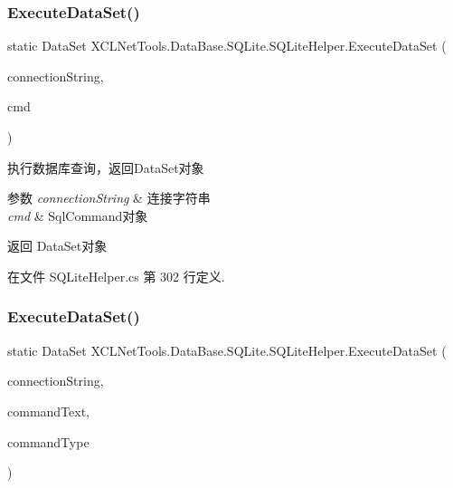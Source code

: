 \subsubsection{\texorpdfstring{Execute\+Data\+Set()}{ExecuteDataSet()}\hspace{0.1cm}{\footnotesize\ttfamily [1/3]}}
{\footnotesize\ttfamily static Data\+Set X\+C\+L\+Net\+Tools.\+Data\+Base.\+S\+Q\+Lite.\+S\+Q\+Lite\+Helper.\+Execute\+Data\+Set (\begin{DoxyParamCaption}\item[{string}]{connection\+String,  }\item[{S\+Q\+Lite\+Command}]{cmd }\end{DoxyParamCaption})\hspace{0.3cm}{\ttfamily [static]}}



执行数据库查询，返回\+Data\+Set对象 


\begin{DoxyParams}{参数}
{\em connection\+String} & 连接字符串\\
\hline
{\em cmd} & Sql\+Command对象\\
\hline
\end{DoxyParams}
\begin{DoxyReturn}{返回}
Data\+Set对象
\end{DoxyReturn}


在文件 S\+Q\+Lite\+Helper.\+cs 第 302 行定义.

\mbox{\label{class_x_c_l_net_tools_1_1_data_base_1_1_s_q_lite_1_1_s_q_lite_helper_a4806433651289941b9507696bb3a64d0}} 
\subsubsection{\texorpdfstring{Execute\+Data\+Set()}{ExecuteDataSet()}\hspace{0.1cm}{\footnotesize\ttfamily [2/3]}}
{\footnotesize\ttfamily static Data\+Set X\+C\+L\+Net\+Tools.\+Data\+Base.\+S\+Q\+Lite.\+S\+Q\+Lite\+Helper.\+Execute\+Data\+Set (\begin{DoxyParamCaption}\item[{string}]{connection\+String,  }\item[{string}]{command\+Text,  }\item[{Command\+Type}]{command\+Type }\end{DoxyParamCaption})\hspace{0.3cm}{\ttfamily [static]}}



